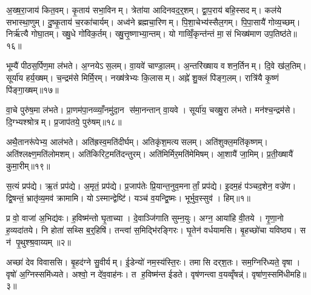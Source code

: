 अ॒ख्ष॒रा॒जाय॑ कित॒वम्। कृ॒ताय॑ सभा॒विनम्। त्रेता॑या आदिनवद॒र्॒शम्। द्वा॒प॒राय॑ बहि॒स्सदम्। कल॑ये सभास्था॒णुम्। दु॒ष्कृ॒ताय॑ च॒रका॑चार्यम्। अध्व॑ने ब्रह्मचा॒रिणम्। पि॒शा॒चेभ्य॑स्सैल॒गम्। पि॒पा॒सायै॑ गोव्य॒च्छम्। निर्\mbox{}ऋ॑त्यै गोघा॒तम्। ख्षु॒धे गो॑विक॒र्तम्। ख्षु॒त्तृ॒ष्णाभ्या॒न्तम्। यो गाव्विँ॒कृन्त॑न्तं मा॒सं भिख्ष॑माण उप॒तिष्ठ॑ते॥१६॥

भूम्यै॑ पीठस॒र्पिण॒मा ल॑भते। अ॒ग्नयेऽस॒लम्। वा॒यवे॑ चाण्डा॒लम्। अ॒न्तरि॑ख्षाय वशन॒र्तिनम्। दि॒वे ख॑ल॒तिम्। सूर्या॑य हर्य॒ख्षम्। च॒न्द्रम॑से मिर्मि॒रम्। नख्ष॑त्रेभ्यः कि॒लासम्। अह्ने॑ शु॒क्लं पि॑ङ्ग॒लम्। रात्रि॑यै कृ॒ष्णं पि॑ङ्गा॒ख्षम्॥१७॥

वा॒चे पुरु॑ष॒मा ल॑भते। प्रा॒णम॑पा॒नव्व्याँ॒नमु॑दा॒न स॑मा॒नन्तान् वा॒यवे। सूर्या॑य॒ चख्षु॒रा ल॑भते। मन॑श्च॒न्द्रम॑से। दि॒ग्भ्यश्श्रोत्रम्। प्र॒जाप॑तये॒ पुरु॑षम्॥१८॥

अथै॒तानरू॑पेभ्य॒ आल॑भते। अति॑ह्रस्व॒मति॑दीर्घम्। अतिकृ॑श॒मत्यसलम्। अति॑शुक्ल॒मति॑कृष्णम्। अति॑श्लक्ष्ण॒मति॑लोमशम्। अति॑किरिट॒मति॑दन्तुरम्। अति॑मिर्मिर॒मति॑मेमिषम्। आ॒शायै॑ जा॒मिम्। प्र॒ती॒ख्षायै॑ कुमा॒रीम्॥१९॥



\clearpage
{}
\setcounter{anuvakam}{0}
स॒त्यं प्रप॑द्ये। ऋ॒तं प्रप॑द्ये। अ॒मृतं॒ प्रप॑द्ये। प्र॒जाप॑तेः प्रि॒यान्त॒नुव॒मनार्तां॒ प्रप॑द्ये। इ॒दम॒हं प॑ञ्चद॒शेन॒ वज्रे॑ण। द्वि॒षन्तं॒ भ्रातृ॑व्य॒मव॑ क्रामामि। योऽस्मान्द्वेष्टि॑। यञ्च॑ व॒यन्द्वि॒ष्मः। भूर्भुव॒स्सुव॑। हिम्॥१॥\anuvakamend[स॒त्यन्दश॑]

प्र वो॒ वाजा॑ अ॒भिद्य॑वः। ह॒विष्म॑न्तो घृ॒ताच्या। दे॒वाञ्जि॑गाति सुम्न॒युः। अग्न॒ आया॑हि वी॒तये। गृ॒णा॒नो ह॒व्यदा॑तये। नि होता॑ सथ्सि ब॒र्॒हिषि॑। तन्त्वा॑ स॒मिद्भि॑रङ्गिरः। घृ॒तेन॑ वर्धयामसि। बृ॒हच्छो॑चा यविष्ठ्य। स न॑ पृ॒थुश्श्र॒वाय्यम्॥२॥

अच्छा॑ देव विवाससि। बृ॒हद॑ग्ने सु॒वीर्यम्। ई॒डेन्यो॑ नम॒स्य॑स्ति॒रः। तमासि दर्‌श॒तः। सम॒ग्निरि॑ध्यते॒ वृषा। वृषो॑ अ॒ग्निस्समि॑ध्यते। अश्वो॒ न दे॑व॒वाह॑नः। त ह॒विष्म॑न्त ईडते। वृष॑णन्त्वा व॒यव्वृँषन्न्॑। वृषा॑ण॒स्समि॑धीमहि॥३॥

